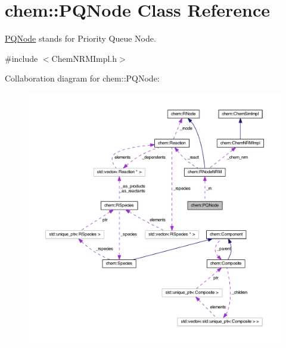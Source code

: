 \hypertarget{classchem_1_1PQNode}{\section{chem\-:\-:P\-Q\-Node Class Reference}
\label{classchem_1_1PQNode}
}


\hyperlink{classchem_1_1PQNode}{P\-Q\-Node} stands for Priority Queue Node.  




{\ttfamily \#include $<$Chem\-N\-R\-M\-Impl.\-h$>$}



Collaboration diagram for chem\-:\-:P\-Q\-Node\-:\nopagebreak
\begin{figure}[H]
\begin{center}
\leavevmode
\includegraphics[width=350pt]{classchem_1_1PQNode__coll__graph}
\end{center}
\end{figure}
